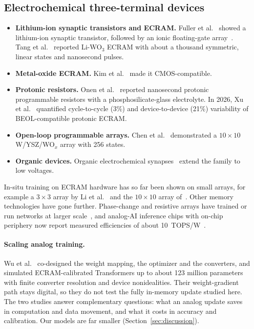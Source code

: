 \subsection{Electrochemical three-terminal devices}
\begin{itemize}
\item \textbf{Lithium-ion synaptic transistors and ECRAM.} Fuller et al.~\cite{fuller2017} showed a lithium-ion synaptic
      transistor, followed by an ionic floating-gate array~\cite{fuller2019}. Tang et al.~\cite{tang2018} reported Li-WO$_3$ ECRAM
      with about a thousand symmetric, linear states and nanosecond pulses.
\item \textbf{Metal-oxide ECRAM.} Kim et al.~\cite{kim2019} made it CMOS-compatible.
\item \textbf{Protonic resistors.} Onen et al.~\cite{onen2022} reported nanosecond protonic programmable resistors with a
      phosphosilicate-glass electrolyte. In 2026, Xu et al.~\cite{xu2026} quantified cycle-to-cycle (3\%) and device-to-device
      (21\%) variability of BEOL-compatible protonic ECRAM.
\item \textbf{Open-loop programmable arrays.} Chen et al.~\cite{chen2023} demonstrated a $10\times10$ W/YSZ/WO$_x$ array with
      256 states.
\item \textbf{Organic devices.} Organic electrochemical synapses~\cite{vandeburgt2017} extend the family to low voltages.
\end{itemize}
In-situ training on ECRAM hardware has so far been shown on small arrays, for example a $3\times3$ array by Li et
al.~\cite{li2021ecram} and the $10\times10$ array of~\cite{chen2023}. Other memory technologies have gone further. Phase-change and
resistive arrays have trained or run networks at larger scale~\cite{prezioso2015,ambrogio2018,yao2020,wan2022}, and analog-AI
inference chips with on-chip periphery now report measured efficiencies of about 10~TOPS/W~\cite{ambrogio2023,legallo2023}.

\paragraph{Scaling analog training.} Wu et al.~\cite{wu2026scale} co-designed the weight mapping, the optimizer and the
converters, and simulated ECRAM-calibrated Transformers up to about 123 million parameters with finite converter resolution and
device nonidealities. Their weight-gradient path stays digital, so they do not test the fully in-memory update studied here.
The two studies answer complementary questions: what an analog update saves in computation and data movement, and what it
costs in accuracy and calibration. Our models are far smaller (Section~\ref{sec:discussion}).
